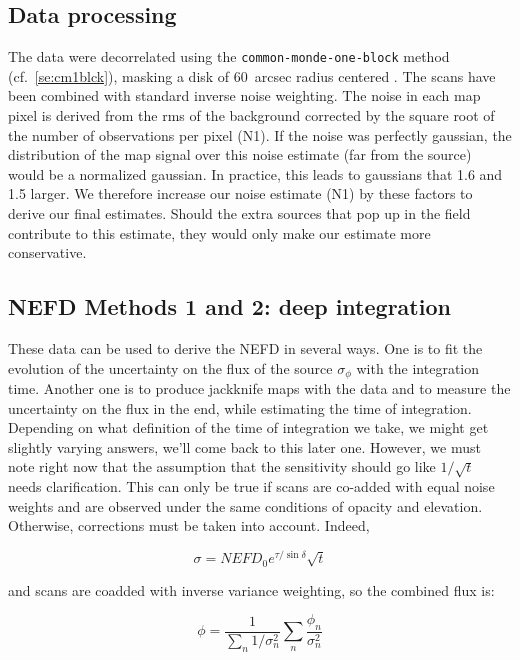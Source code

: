 \subsection{Data processing}

The data were decorrelated using the {\tt common-monde-one-block} method
(cf.~\ref{se:cm1blck}), masking a disk of 60~arcsec radius centered \hls.  The
scans have been combined with standard inverse noise weighting. The noise in
each map pixel is derived from the rms of the background corrected by the square
root of the number of observations per pixel (N1). If the noise was perfectly
gaussian, the distribution of the map signal over this noise estimate (far from
the source) would be a normalized gaussian. In practice, this leads to gaussians
that 1.6 and 1.5 larger. We therefore increase our noise estimate (N1) by these
factors to derive our final estimates. Should the extra sources that pop up in
the field contribute to this estimate, they would only make our estimate more
conservative.

\subsection{NEFD Methods 1 and 2: deep integration}


These data can be used to derive the NEFD in several ways. One is to fit the
evolution of the uncertainty on the flux of the source $\sigma_\phi$ with the
integration time. Another one is to produce jackknife maps with the data and to
measure the uncertainty on the flux in the end, while estimating the time of
integration. Depending on what definition of the time of integration we take, we
might get slightly varying answers, we'll come back to this later one. However,
we must note right now that the assumption that the sensitivity should go like
$1/\sqrt{t}$ needs clarification. This can only be true if scans are co-added
with equal noise weights and are observed under the same conditions of opacity
and elevation. Otherwise, corrections must be taken into account. Indeed, 

\begin{equation}
\sigma = NEFD_0e^{\tau/\sin\delta}\sqrt{t}
\label{eq:sigma_nefd}
\end{equation}

and scans are coadded with inverse variance weighting, so the combined flux is:

\begin{equation}
\phi = \frac{1}{\sum_n 1/\sigma_n^2}\sum_n\frac{\phi_n}{\sigma_n^2}
\end{equation}

